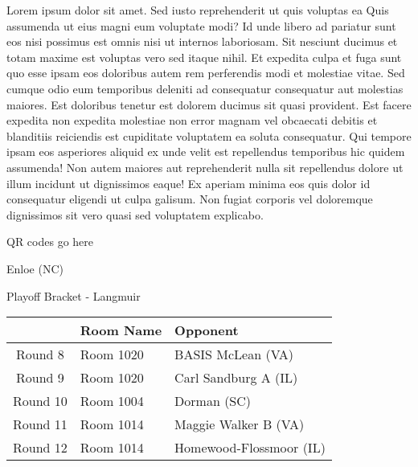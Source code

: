 \documentclass{article}%
\begin{document}
\vspace*{8pt}%
\linebreak%
\newline%
\newline%
Lorem ipsum dolor sit amet. Sed iusto reprehenderit ut quis voluptas ea Quis assumenda ut eius magni eum voluptate modi? Id unde libero ad pariatur sunt eos nisi possimus est omnis nisi ut internos laboriosam. Sit nesciunt ducimus et totam maxime est voluptas vero sed itaque nihil. Et expedita culpa et fuga sunt quo esse ipsam eos doloribus autem rem perferendis modi et molestiae vitae.\newline%
\newline%
Sed cumque odio eum temporibus deleniti ad consequatur consequatur aut molestias maiores. Est doloribus tenetur est dolorem ducimus sit quasi provident. Est facere expedita non expedita molestiae non error magnam vel obcaecati debitis et blanditiis reiciendis est cupiditate voluptatem ea soluta consequatur. Qui tempore ipsam eos asperiores aliquid ex unde velit est repellendus temporibus hic quidem assumenda!\newline%
\newline%
Non autem maiores aut reprehenderit nulla sit repellendus dolore ut illum incidunt ut dignissimos eaque! Ex aperiam minima eos quis dolor id consequatur eligendi ut culpa galisum. Non fugiat corporis vel doloremque dignissimos sit vero quasi sed voluptatem explicabo.\newline%
\newline%
%
\vspace*{30pt}%
\begin{center}%
\begin{Huge}%
QR codes go here%
\end{Huge}%
\end{center}%
\newpage%
\begin{center}%
\begin{Huge}%
Enloe (NC)%
\end{Huge}%
\vspace*{8pt}%
\linebreak%
\begin{Large}%
Playoff Bracket {-} Langmuir%
\end{Large}%
\end{center}%
%
\begin{tabularx}{\textwidth}{|c|Y|Y|}%
\hline%
&Room Name&Opponent\\%
\hline%
Round 8&Room 1020&BASIS McLean (VA)\\%
Round 9&Room 1020&Carl Sandburg A (IL)\\%
Round 10&Room 1004&Dorman (SC)\\%
Round 11&Room 1014&Maggie Walker B (VA)\\%
Round 12&Room 1014&Homewood{-}Flossmoor (IL)\\%
\hline%
\end{tabularx}%
\end{document}
